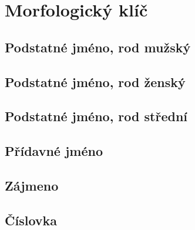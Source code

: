 \fi


\ifinputmorpho

\cleardoublepage

\chapter{Morfologický klíč}                      \label{sec:morpho}

\section{Podstatné jméno, rod mužský}            \label{sec:morpho_m}
{\small{}}
\clearpage

\section{Podstatné jméno, rod ženský}            \label{sec:morpho_f}
{\small{}}
\clearpage

\section{Podstatné jméno, rod střední}           \label{sec:morpho_n}
{\small{}}
\clearpage

\section{Přídavné jméno}                         \label{sec:morpho_adj}
{\small{}}
\clearpage

\section{Zájmeno}                                \label{sec:morpho_pron}
{\small{}}
 
\clearpage

\section{Číslovka}                               \label{sec:morpho_num}
 {\small{}}
\clearpage

